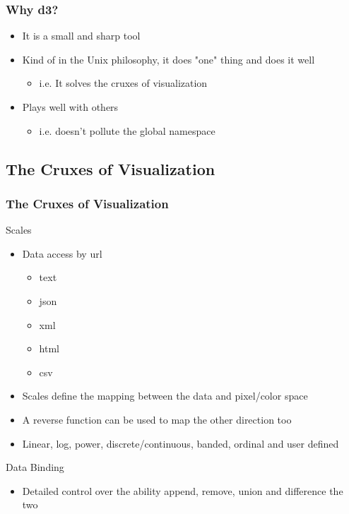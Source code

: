 \documentclass{beamer}
\begin{document}
\begin{frame}
\frametitle{Why d3?}
\begin{itemize}
\item It is a small and sharp tool 
\item Kind of in the Unix philosophy, it does "one" thing and does it well
\begin{itemize}
\item i.e. It solves the cruxes of visualization
\end{itemize}
\item Plays well with others
\begin{itemize}
\item i.e. doesn't pollute the global namespace
\end{itemize}
\end{itemize}
\end{frame}



\subsection{The Cruxes of Visualization}

\begin{frame}
\frametitle{The Cruxes of Visualization}

\begin{block}{Scales}
\begin{itemize}
\item Data access by url
\begin{itemize}
\item text
\item json
\item xml
\item html
\item csv
\end{itemize}
\item Scales define the mapping between the data and pixel/color space
\item A reverse function can be used to map the other direction too
\item Linear, log, power, discrete/continuous, banded, ordinal and user defined
\end{itemize}
\end{block}

\begin{block}{Data Binding}
\begin{itemize}
\item Detailed control over the ability append, remove, union and difference the two
\end{itemize}
\end{block}

\end{frame}
\end{document}
